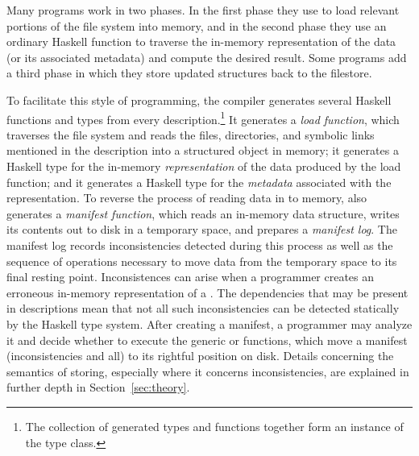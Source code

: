 Many \forest{} programs work in two phases. In the first phase they
use \forest{} to load relevant portions of the file system into memory,
and in the second phase they use an ordinary Haskell function to
traverse the in-memory representation of the data (or its associated
metadata) and compute the desired result.  Some \forest{} programs
add a third phase in which they store updated structures back to the
filestore.

To facilitate this style of programming, the \forest{} compiler
generates several Haskell functions and types from every \forest{}
description.\footnote{The collection of generated types and functions 
together form an instance of the  type class.}
It generates a \emph{load function}, which traverses the
file system and reads the files, directories, and symbolic links
mentioned in the description into a structured object in memory; 
it
generates a Haskell type for the in-memory \emph{representation} of
the data produced by the load function; and it generates a Haskell
type for the \emph{metadata} associated with the representation. 
To reverse the process of reading data in to memory, \forest{}
also generates a \emph{manifest function}, which reads an in-memory
data structure, writes its contents out to disk in a temporary
space, and prepares a 
\emph{manifest log}.  The manifest log records inconsistencies
detected during this process as well as the sequence
of operations necessary to move data from the temporary space to
its final resting point.  Inconsistences
can arise when a programmer creates an erroneous in-memory
representation of a \filestore{}.
The dependencies that may be present in
\forest{} descriptions mean that not all such inconsistencies 
can be detected statically by the Haskell type system.
After creating a manifest, a programmer may analyze it
and decide whether to execute the 
generic  or 
functions, which move a manifest (inconsistencies and all) to its 
rightful position on disk. 
Details concerning the semantics of storing, 
especially where it concerns inconsistencies,
are explained in further depth in Section~\ref{sec:theory}.

